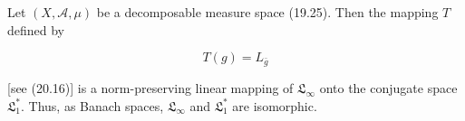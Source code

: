 Let $(X, \mathcal{A}, \mu)$ be a decomposable measure space (19.25). Then the mapping $T$ defined by

$$T(g) = L_{\bar{g}}$$

[see (20.16)] is a norm-preserving linear mapping of $\mathfrak{L}_{\infty}$ onto the conjugate space $\mathfrak{L}_1^*$. Thus, as Banach spaces, $\mathfrak{L}_{\infty}$ and $\mathfrak{L}_1^*$ are isomorphic.